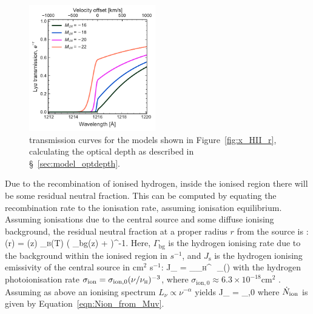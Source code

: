 \documentclass[fleqn,usenatbib]{mnras}
\begin{document}
\begin{figure}
    \includegraphics[width=0.49\textwidth]{figs/fig3.pdf}
    \caption{\lya transmission curves for the models shown in Figure~\ref{fig:x_HII_r}, calculating the optical depth as described in \S~\ref{sec:model_optdepth}.}
    \label{fig:transmission_Muv}
\end{figure}
Due to the recombination of ionised hydrogen, inside the ionised region there will be some residual neutral fraction. This can be computed by equating the recombination rate to the ionisation rate, assuming ionisation equilibrium. Assuming ionisations due to the central source and some diffuse ionising background, the residual neutral fraction at a proper radius $r$ from the source is \citep[e.g.,][]{Mesinger2004}:
%
\BE \label{eqn:HII_xHI}
\xHI(r) = \clump \Delta \nh(z) \alpha_\textsc{b}(T) \left( \Gamma_\textrm{bg}(z) +  \right)^{-1}.
\EE
%
Here, $\Gamma_\textrm{bg}$ is the hydrogen ionising rate due to the background within the ionised region in $s^{-1}$, and $J_\mathrm{s}$ is the hydrogen ionising emissivity of the central source in cm$^2$ s$^{-1}$:
%
\BE \label{eqn:HII_gammasource}
J_ = \fesc \int_{\nu_\textsc{h}}^\infty \,\dd\nu \,  \sigma_(\nu)
\EE
%
with the hydrogen photoionisation rate $\sigma_\mathrm{ion} = \sigma_{\mathrm{ion},0} (\nu/\nu_\textsc{h})^{-3}$, where $\sigma_{\mathrm{ion},0} \approx 6.3\times10^{-18}\textrm{cm}^2$ \citep[e.g.,][]{Draine2011}. Assuming as above an ionising spectrum $L_\nu \propto \nu^{-\alpha}$ yields
%
\BE \label{eqn:HII_gammasource_Nion}
J_ = \fesc  \Nion {} \sigma_{,0}
\EE
%
where $\Nion$ is given by Equation~\eqref{eqn:Nion_from_Muv}. 
\end{document}
